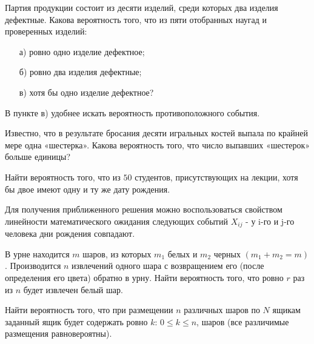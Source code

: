 \begin{problem}
Партия продукции состоит из десяти изделий, среди которых два изделия дефектные. Какова вероятность того, что из пяти отобранных 
наугад и проверенных изделий: 
\begin{enumerate}
\item[а)] ровно одно изделие дефектное; 
\item[б)] ровно два изделия дефектные; 
\item[в)] хотя бы одно изделие дефектное? 
\end{enumerate} 

\begin{ordre}
В пункте в) удобнее искать вероятность противоположного события.
\end{ordre}

\end{problem}

\begin{problem}
Известно, что в результате бросания десяти игральных костей выпала  по крайней мере одна «шестерка». Какова вероятность того, что число выпавших «шестерок» больше единицы?
\end{problem}

\begin{problem}
Найти вероятность того, что из $50$ студентов, присутствующих на лекции, хотя бы двое имеют одну и ту же дату рождения. 

\begin{remark}
Для получения приближенного решения можно воспользоваться свойством линейности математического ожидания следующих событий $X_{ij}$ - у  i-го и  j-го человека дни рождения совпадают.  
\end{remark}

\end{problem}


\begin{problem}
В урне находится $m$ шаров, из которых $m_1$ белых и $m_2$ черных $(m_1 + m_2 = m)$. 
Производится $n$ извлечений одного шара с возвращением его (после определения его цвета) обратно в урну. Найти вероятность того, 
что ровно $r$ раз из $n$ будет извлечен белый шар. 
\end{problem}


\begin{problem}
Найти вероятность того, что при размещении $n$ различных шаров по $N$ ящикам заданный ящик будет содержать ровно 
$k$: $0\leqslant k\leqslant n$, шаров (все различимые размещения равновероятны). 
\end{problem}


